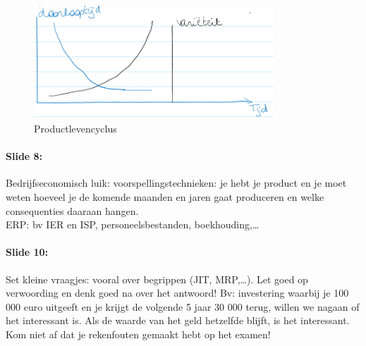 \documentclass[10pt,a4paper]{report}
\begin{document}
\begin{figure}[h!]
\centering
\includegraphics[width=90mm]{Les01_01.png}
\caption{Productlevencyclus} 
\label{les01_01}
\end{figure}

\paragraph{Slide 8:} Bedrijfseconomisch luik: voorspellingstechnieken: je hebt je product en je moet weten hoeveel je de komende maanden en jaren gaat produceren en welke consequenties daaraan hangen.\\
ERP: bv IER en ISP, personeelsbestanden, boekhouding,… 

\paragraph{Slide 10:} Set kleine vraagjes: vooral over begrippen (JIT, MRP,…). Let goed op verwoording en denk goed na over het antwoord! Bv: investering waarbij je 100 000 euro uitgeeft en je krijgt de volgende 5 jaar 30 000 terug, willen we nagaan of het interessant is. Als de waarde van het geld hetzelfde blijft, is het interessant. Kom niet af dat je rekenfouten gemaakt hebt op het examen!
\end{document}
